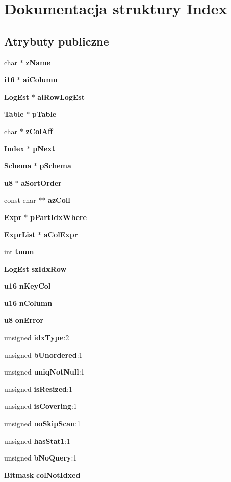 \section{Dokumentacja struktury Index}
\label{struct_index}
\subsection*{Atrybuty publiczne}
\begin{DoxyCompactItemize}
\item 
char $\ast$ \textbf{ z\+Name}
\item 
\textbf{ i16} $\ast$ \textbf{ ai\+Column}
\item 
\textbf{ Log\+Est} $\ast$ \textbf{ ai\+Row\+Log\+Est}
\item 
\textbf{ Table} $\ast$ \textbf{ p\+Table}
\item 
char $\ast$ \textbf{ z\+Col\+Aff}
\item 
\textbf{ Index} $\ast$ \textbf{ p\+Next}
\item 
\textbf{ Schema} $\ast$ \textbf{ p\+Schema}
\item 
\textbf{ u8} $\ast$ \textbf{ a\+Sort\+Order}
\item 
const char $\ast$$\ast$ \textbf{ az\+Coll}
\item 
\textbf{ Expr} $\ast$ \textbf{ p\+Part\+Idx\+Where}
\item 
\textbf{ Expr\+List} $\ast$ \textbf{ a\+Col\+Expr}
\item 
int \textbf{ tnum}
\item 
\textbf{ Log\+Est} \textbf{ sz\+Idx\+Row}
\item 
\textbf{ u16} \textbf{ n\+Key\+Col}
\item 
\textbf{ u16} \textbf{ n\+Column}
\item 
\textbf{ u8} \textbf{ on\+Error}
\item 
unsigned \textbf{ idx\+Type}\+:2
\item 
unsigned \textbf{ b\+Unordered}\+:1
\item 
unsigned \textbf{ uniq\+Not\+Null}\+:1
\item 
unsigned \textbf{ is\+Resized}\+:1
\item 
unsigned \textbf{ is\+Covering}\+:1
\item 
unsigned \textbf{ no\+Skip\+Scan}\+:1
\item 
unsigned \textbf{ has\+Stat1}\+:1
\item 
unsigned \textbf{ b\+No\+Query}\+:1
\item 
\textbf{ Bitmask} \textbf{ col\+Not\+Idxed}
\end{DoxyCompactItemize}


